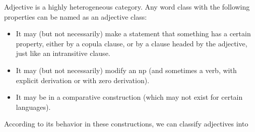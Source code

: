 \documentclass[UTF8, a4paper, oneside, scheme=plain]{ctexart}
\begin{document}
Adjective is a highly heterogeneous category. 
Any word class with the following properties can be named as an adjective class: 
\begin{itemize}
    \item It may (but not necessarily) make a statement that something has a certain property, 
    either by a copula clause,
    or by a clause headed by the adjective, 
    just like an intransitive clause.
    \item It may (but not necessarily) modify an \ac{np} 
    (and sometimes a verb, with explicit derivation or with zero derivation).
    \item It may be in a comparative construction (which may not exist for certain languages).
\end{itemize}

According to its behavior in these constructions, we can classify adjectives into
\end{document}
